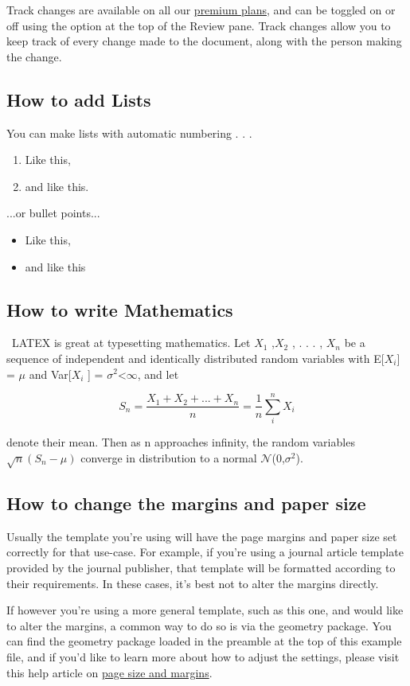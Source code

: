\documentclass[10pt,english]{article}
\begin{document}
	  Track changes are available on all our \href{https://www.overleaf.com/user/subscription/plans}{premium plans}, and can be toggled on or off using the option
	at the top of the Review pane. Track changes allow you to keep track of every change made to the
	document, along with the person making the change.
	\subsection{How to add Lists}
	You can make lists with automatic numbering . . .
	\begin{enumerate}
		\item Like this,
		\item and like this.
	\end{enumerate}
	...or bullet points...
	\begin{itemize}
		\item Like this,
		\item and like this
	\end{itemize}
	\subsection{How to write Mathematics}\
	LATEX is great at typesetting mathematics. Let $X_1$ ,$X_2$ , . . . , $X_n$ be a sequence of independent and identically distributed random variables with E[$X_i$] = $\mu$ and Var[$X_i$ ] = $\sigma^2$\textless$\infty$, and let
	
	\[	S_n =\frac{X_1 + X_2 + ... + X_n}{n} =  \frac{1}{n}\sum_{i}^{n} X_i\]
	
		
	    
	     
	denote their mean. Then as n approaches infinity, the random variables 
	\begin{math}
	 \sqrt{n}(S_n - \mu)
	 \end{math}
	 converge in distribution to a normal $\mathcal{N}$(0,$\sigma^2$).
	\subsection{How to change the margins and paper size}
	Usually the template you’re using will have the page margins and paper size set correctly for that
	use-case. For example, if you’re using a journal article template provided by the journal publisher,
	that template will be formatted according to their requirements. In these cases, it’s best not to alter
	the margins directly.
	
  	If however you’re using a more general template, such as this one, and would like to alter the
	margins, a common way to do so is via the geometry package. You can find the geometry package
	loaded in the preamble at the top of this example file, and if you’d like to learn more about how to
	adjust the settings, please visit this help article on \href{https://www.overleaf.com/learn/latex/page_size_and_margins}{page size and margins}.
\end{document}
